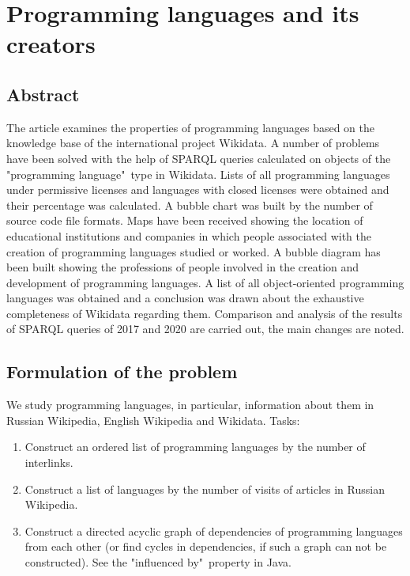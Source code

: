 \setchapterpreamble[u]{\margintoc}
\chapter{Programming languages and its creators\protect\footnotemark}


\section{Abstract}
The article examines the properties of programming languages based on the knowledge base of the international project Wikidata. A number of problems have been solved with the help of SPARQL queries calculated on objects of the "programming language"\  type in Wikidata. Lists of all programming languages under permissive licenses and languages with closed licenses were obtained and their percentage was calculated. A bubble chart was built by the number of source code file formats. Maps have been received showing the location of educational institutions and companies in which people associated with the creation of programming languages studied or worked. A bubble diagram has been built showing the professions of people involved in the creation and development of programming languages. A list of all object-oriented programming languages was obtained and a conclusion was drawn about the exhaustive completeness of Wikidata regarding them. Comparison and analysis of the results of SPARQL queries of 2017 and 2020 are carried out, the main changes are noted.

\section{Formulation of the problem}
We study programming languages, in particular, information about them in Russian Wikipedia, English Wikipedia and Wikidata.
Tasks:
\begin{enumerate}
\item Construct an ordered list of programming languages by the number of interlinks.
\item Construct a list of languages by the number of visits of articles in Russian Wikipedia.
\item Construct a directed acyclic graph of dependencies of programming languages from each other (or find cycles in dependencies, if such a graph can not be constructed). See the "influenced by"\  property in Java.
\end{enumerate}

